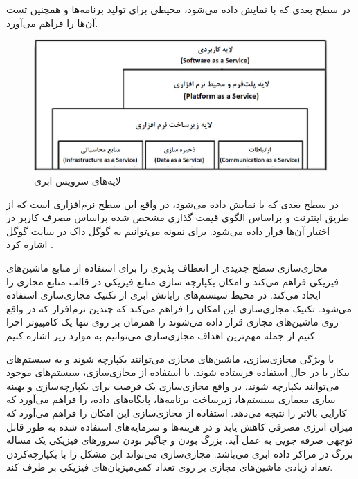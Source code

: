  در سطح بعدی که با 
  نمایش داده می‌شود، محیطی برای تولید برنامه‌ها و همچنین تست آن‌ها  را فراهم می‌آورد. 
            \begin{figure}
	\includegraphics[width=1\textwidth]{files/layers.jpg}
	\caption{لایه‌های سرویس ابری}
\end{figure}
  
 در سطح بعدی که با 
 نمایش داده می‌شود، در واقع این سطح نرم‌افزاری است که از طریق اینترنت و براساس الگوی قیمت گذاری مشخص شده براساس مصرف کاربر در اختیار آن‌ها قرار داده می‌شود. برای نمونه می‌توانیم به گوگل داک در سایت گوگل اشاره کرد
  \cite{num3,num4}.


مجازی‌سازی سطح جدیدی از انعطاف پذیری را برای استفاده از منابع ماشین‌های فیزیکی
 فراهم می‌کند و امکان یکپارچه سازی منابع فیزیکی   در قالب منابع مجازی  را ایجاد می‌کند. در محیط سیستم‌های رایانش ابری از تکنیک مجازی‌سازی استفاده می‌شود. تکنیک مجازی‌سازی این امکان را فراهم می‌کند که چندین نرم‌افزار که در واقع روی ماشین‌های مجازی
 قرار داده می‌شوند را همزمان بر روی تنها یک کامپیوتر اجرا کنیم از جمله مهم‌ترین اهداف مجازی‌سازی می‌توانیم به موارد زیر اشاره کنیم.

با ویژگی مجازی‌سازی، ماشین‌های مجازی می‌توانند یکپارچه شوند و به سیستم‌های بیکار یا در حال استفاده فرستاده شوند. با استفاده از مجازی‌سازی، سیستم‌های موجود می‌توانند یکپارچه شوند. در واقع مجازی‌سازی یک فرصت برای یکپارچه‌سازی و بهینه سازی معماری سیستم‌ها، زیرساخت برنامه‌ها، پایگاه‌های داده، را فراهم می‌آورد که کارایی بالاتر را نتیجه می‌دهد.
 استفاده از مجازی‌سازی این امکان را فراهم می‌آورد که میزان انرژی مصرفی کاهش یابد و در هزینه‌ها و سرمایه‌های استفاده شده به طور قابل توجهی صرفه جویی به عمل آید.
  بزرگ بودن و جاگیر بودن سرورهای فیزیکی یک مساله بزرگ در مراکز داده ابری می‌باشد. مجازی‌سازی می‌تواند این مشکل را با یکپارچه‌کردن تعداد زیادی ماشین‌های مجازی بر روی تعداد کمی‌میزبان‌های فیزیکی بر طرف کند.
  
